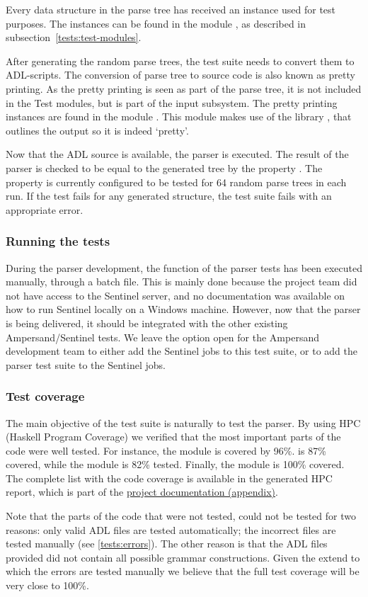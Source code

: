   Every data structure in the parse tree has received an  instance used for test purposes.
  The instances can be found in the module , as described in subsection~\ref{tests:test-modules}.
  
  After generating the random parse trees, the test suite needs to convert them to ADL-scripts.
  The conversion of parse tree to source code is also known as pretty printing.
  As the pretty printing is seen as part of the parse tree, it is not included in the Test modules, but is part of the input subsystem.
  The pretty printing instances are found in the module .
  This module makes use of the library , that outlines the output so it is indeed `pretty'.
  
  Now that the ADL source is available, the parser is executed.
  The result of the parser is checked to be equal to the generated tree by the property .
  The property is currently configured to be tested for 64 random parse trees in each run.
  If the test fails for any generated structure, the test suite fails with an appropriate error.
  
  \subsubsection{Running the tests}
  During the parser development, the  function of the parser tests has been executed manually, through a batch file.
  This is mainly done because the project team did not have access to the Sentinel server, and no documentation was available on how to run Sentinel locally on a Windows machine.
  However, now that the parser is being delivered, it should be integrated with the other existing Ampersand/Sentinel tests.
  We leave the option open for the Ampersand development team to either add the Sentinel jobs to this test suite, or to add the parser test suite to the Sentinel jobs.
  
  \subsubsection{Test coverage}
  The main objective of the test suite is naturally to test the parser.
  By using HPC (Haskell Program Coverage) we verified that the most important parts of the code were well tested.
  For instance, the  module is covered by 96\%.
   is 87\% covered, while the module  is 82\% tested.
  Finally, the module  is 100\% covered.
  The complete list with the code coverage is available in the generated HPC report, which is part of the \hyperref[app:docs]{project documentation (appendix)}.
  
  Note that the parts of the code that were not tested, could not be tested for two reasons: only valid ADL files are tested automatically; the incorrect files are tested manually (see \autoref{tests:errors}).
  The other reason is that the ADL files provided did not contain all possible grammar constructions.
  Given the extend to which the errors are tested manually we believe that the full test coverage will be very close to 100\%.
  